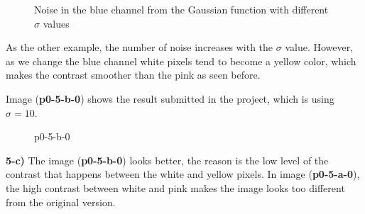 \documentclass[12pt,a4paper]{article}
\begin{document}
\begin{figure}[!h]
	\quad
	\caption{Noise in the blue channel  from the Gaussian function with different $\sigma$ values}%
	\label{fig:blue-sigma}%
\end{figure}

As the other example, the number of noise increases with the $\sigma$ value. However, as we change the blue channel white pixels tend to become a yellow color, which makes the contrast smoother than the pink as seen before.

Image (\textbf{p0-5-b-0}) shows the result submitted in the project, which is using $\sigma = 10$.

\begin{figure}[!h]
	\centering
	{%
		\setlength{\fboxsep}{1pt}%
		\setlength{\fboxrule}{1pt}%
	}%
	\caption{p0-5-b-0}
	\label{fig:p0-5-b-0}
\end{figure}


\textbf{5-c) } The image (\textbf{p0-5-b-0}) looks better, the reason is the low level of the contrast that happens between the white and yellow pixels. In image (\textbf{p0-5-a-0}), the high contrast between white and pink makes the image looks too different from the original version.
\end{document}
